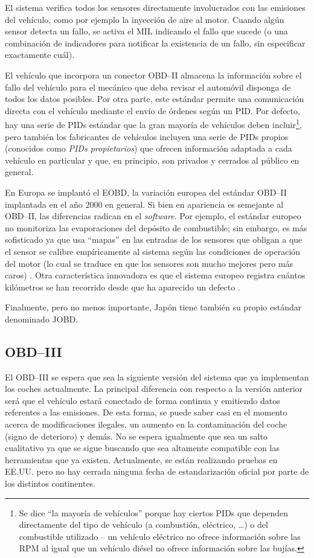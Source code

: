 El sistema verifica todos los sensores directamente involucrados con las emisiones
del vehículo, como por ejemplo la inyección de aire al motor. Cuando algún sensor detecta
un fallo, se activa el \ac{MIL} indicando el fallo que sucede (o una combinación
de indicadores para notificar la existencia de un fallo, sin especificar exactamente
cuál).

El vehículo que incorpora un conector \ac{OBD}--II almacena la información sobre el
fallo del vehículo para el mecánico que deba revisar el automóvil disponga de todos
los datos posibles. Por otra parte, este estándar permite una comunicación directa
con el vehículo mediante el envío de órdenes según un \ac{PID}. Por defecto, hay
una serie de \ac{PID}s estándar que la gran mayoría de vehículos deben incluir\footnote{%
Se dice ``la mayoría de vehículos'' porque hay ciertos \ac{PID}s que dependen
directamente del tipo de vehículo (a combustión, eléctrico, \dots) o del combustible
utilizado -- un vehículo eléctrico no ofrece información sobre las \ac{RPM} al igual
que un vehículo diésel no ofrece información sobre las bujías.}, pero también
los fabricantes de vehículos incluyen una serie de \ac{PID}s propios (conocidos como
\textit{\ac{PID}s propietarios}) que ofrecen información adaptada a cada vehículo
en particular y que, en principio, son privados y cerrados al público en general.

En Europa se implantó el \ac{EOBD}, la variación europea del estándar \ac{OBD}--II
implantada en el año 2000 en general. Si bien en apariencia es semejante al \ac{OBD}--II,
las diferencias radican en el \textit{software}. Por ejemplo, el estándar europeo
no monitoriza las evaporaciones del depósito de combustible; sin embargo, es más
sofisticado ya que usa ``mapas'' en las entradas de los sensores que obligan a que el
sensor se calibre empíricamente al sistema según las condiciones de operación del
motor (lo cual se traduce en que los sensores son mucho mejores pero más caros)
\cite{SistemaOBD2Historia}. Otra característica innovadora es que el sistema
europeo registra cuántos kilómetros se han recorrido desde que ha aparecido un
defecto \cite{EOBDOBD2}.

Finalmente, pero no menos importante, Japón tiene también su propio estándar denominado
\ac{JOBD}.

\subsection*{OBD--III}
El \ac{OBD}--III se espera que sea la siguiente versión del sistema que ya implementan
los coches actualmente. La principal diferencia con respecto a la versión anterior
será que el vehículo estará conectado de forma continua y emitiendo datos referentes
a las emisiones. De esta forma, se puede saber casi en el momento acerca de modificaciones
ilegales, un aumento en la contaminación del coche (signo de deterioro) y demás. No se
espera igualmente que sea un salto cualitativo ya que se sigue buscando que sea
altamente compatible con las herramientas que ya existen. Actualmente, se están
realizando pruebas en EE.UU. pero no hay cerrada ninguna fecha de estandarización
oficial por parte de los distintos continentes.

